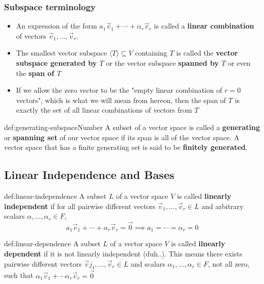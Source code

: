 \documentclass{article}
\begin{document}
\subsubsection{Subspace terminology}
\begin{itemize}
    \item An expression of the form $a_{1}\vec{v}_{1} + \cdots + \alpha_{r} \vec{v}_{r}$ is called a \textbf{linear combination} of vectors $\vec{v}_{1},\dots,\vec{v}_{r}$.
    \item The smallest vector subspace $\langle T \rangle \subseteq V$ containing $T$ is called the \textbf{vector subspace generated by $T$} or the vector subspace \textbf{spanned by $T$} or even the \textbf{span of $T$}
    \item If we allow the zero vector to be the "empty linear combination of $r = 0$ vectors", which is what we will mean from hereon, then the span of $T$ is exactly the set of all linear combinations of vectors from $T$
\end{itemize}

\begin{dfn}{def:generating-subspace}{Number}
    A subset of a vector space is called a \textbf{generating} or \textbf{spanning set} of our vector space if its span is all of the vector space. A vector space that has a finite generating set is said to be \textbf{finitely generated}.
\end{dfn}

\subsection{Linear Independence and Bases}

\begin{dfn}{def:linear-independence}{}
    A subset $L$ of a vector space $V$ is called \textbf{linearly independent} if for all pairwise different vectors $\vec{v}_{1},\dots,\vec{v}_{r}\in L$ and arbitrary scalars $\alpha,\dots,\alpha_{r}\in F$,
    \[a_{1}\vec{v}_{1} + \cdots + \alpha_{r}\vec{v}_{r} = \vec{0} \implies a_{1} = \cdots = \alpha_{r} = 0\]
\end{dfn}

\begin{dfn}{def:linear-dependence}{}
    A subset $L$ of a vector space $V$ is called \textbf{ilnearly dependent} if it is not linearly independent (duh..). This means there exists pairwise different vectors $\vec{v}j_{1},\dots,\vec{v}_{r}\in L$ and scalars $\alpha_{1},\dots,\alpha_{r}\in F$, not all zero, such that $\alpha_{1}\vec{v}_{1} + \cdots \alpha_{r}\vec{v}_{r} = \vec{0}$
\end{dfn}
\end{document}
